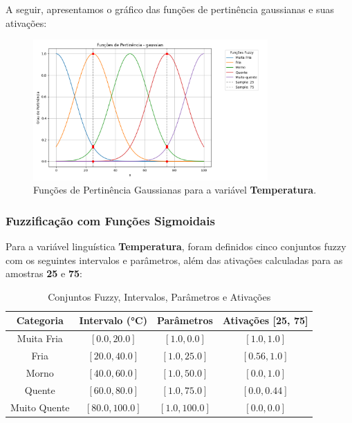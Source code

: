 \documentclass[a4paper,12pt]{article}
\begin{document}
A seguir, apresentamos o gráfico das funções de pertinência gaussianas e suas ativações:

\begin{figure}[H]
    \centering
    \includegraphics[width=0.8\textwidth]{img/funções_de_pertinência_gaussian_fuzzificado.png}
    \caption{Funções de Pertinência Gaussianas para a variável \textbf{Temperatura}.}
\end{figure}

\subsubsection{Fuzzificação com Funções Sigmoidais}

Para a variável linguística \textbf{Temperatura}, foram definidos cinco conjuntos fuzzy com os seguintes intervalos e parâmetros, além das ativações calculadas para as amostras \textbf{25} e \textbf{75}:

\begin{table}[H]
\centering
\caption{Conjuntos Fuzzy, Intervalos, Parâmetros e Ativações}
\begin{tabular}{|c|c|c|c|}
\hline
\textbf{Categoria}    & \textbf{Intervalo (°C)} & \textbf{Parâmetros}       & \textbf{Ativações [25, 75]} \\ \hline
Muita Fria            & $[0.0, 20.0]$          & $[1.0, 0.0]$              & $[1.0, 1.0]$               \\ \hline
Fria                  & $[20.0, 40.0]$         & $[1.0, 25.0]$             & $[0.56, 1.0]$             \\ \hline
Morno                 & $[40.0, 60.0]$         & $[1.0, 50.0]$             & $[0.0, 1.0]$              \\ \hline
Quente                & $[60.0, 80.0]$         & $[1.0, 75.0]$             & $[0.0, 0.44]$             \\ \hline
Muito Quente          & $[80.0, 100.0]$        & $[1.0, 100.0]$            & $[0.0, 0.0]$              \\ \hline
\end{tabular}
\end{table}
\end{document}
